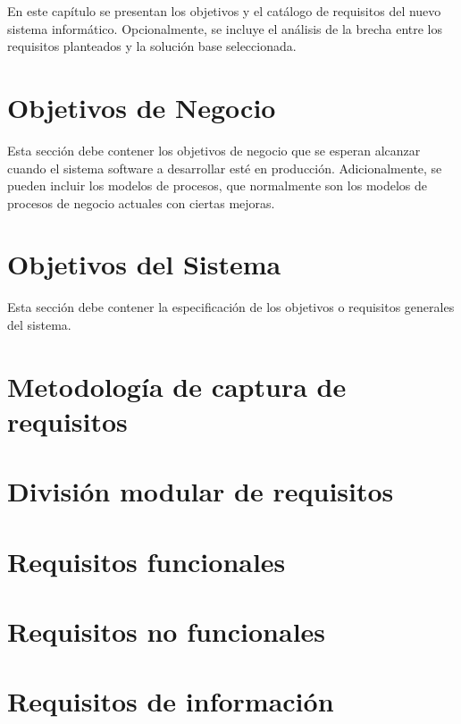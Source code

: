 
En este capítulo se presentan los objetivos y el catálogo de requisitos del nuevo sistema informático. Opcionalmente, se incluye el análisis de la brecha entre los requisitos planteados y la solución base seleccionada. 

\section{Objetivos de Negocio}
Esta sección debe contener los objetivos de negocio que se esperan alcanzar cuando el sistema software a desarrollar esté en producción. Adicionalmente, se pueden incluir los modelos de procesos, que normalmente son los modelos de procesos de negocio actuales con ciertas mejoras.

\section{Objetivos del Sistema}
Esta sección debe contener la especificación de los objetivos o requisitos generales del sistema.

\section{Metodología de captura de requisitos}
\label{sec:RequirementsCaptureMethodology}


\section{División modular de requisitos}
\label{sec:ModularRequirements}


\section{Requisitos funcionales}
\label{sec:FunctionalRequirements}


\section{Requisitos no funcionales}
\label{sec:NonFunctionalRequirements}


\section{Requisitos de información}
\label{sec:InformationRequirements}


